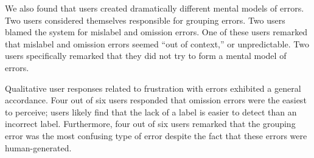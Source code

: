 \documentclass{egpubl}
\begin{document}



We also found that users created dramatically different mental models
of errors.  Two users considered themselves responsible for grouping
errors.  Two users blamed the system for mislabel and omission errors.
One of these users remarked that mislabel and omission errors seemed
``out of context,'' or unpredictable.  Two users specifically remarked
that they did not try to form a mental model of errors.

Qualitative user responses related to frustration with errors
exhibited a general accordance.  Four out of six users responded that
omission errors were the easiest to perceive; users likely find that
the lack of a label is easier to detect than an incorrect label.
Furthermore, four out of six users remarked that the grouping error
was the most confusing type of error despite the fact that these
errors were human-generated.
\end{document}
